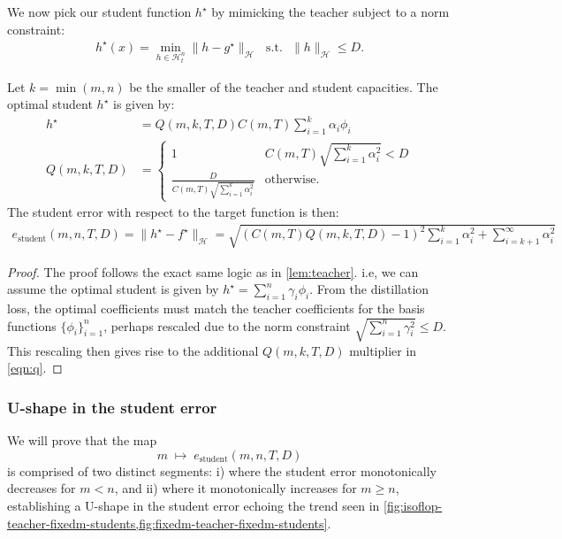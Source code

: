 We now pick our student function $h^\star$ by mimicking the teacher subject to a norm constraint:
\begin{align}
	h^\star(x) = \min_{h \in \mathcal{H}_t^n}\|h - g^\star\|_\mathcal{H} ~~~\text{s.t.}~~~ \|h\|_\mathcal{H} \leq D.
\end{align}
\begin{lemma}\label{lem:student}
	Let $k = \min(m,n)$ be the smaller of the teacher and student capacities. The optimal student $h^\star$ is given by:
	\begin{align}
		h^\star    & = Q(m,k,T,D)C(m,T)\sum_{i=1}^k\alpha_i\phi_i            \\
		Q(m,k,T,D) & = \begin{cases}
			               1                                             & C(m,T)\sqrt{\sum_{i=1}^k\alpha_i^2}<D \\
			               \frac{D}{C(m,T)\sqrt{\sum_{i=1}^k\alpha_i^2}} & \text{otherwise.}
		               \end{cases} \label{eqn:q}
	\end{align}
	The student error with respect to the target function is then:
	\begin{align}
		e_\text{student}(m,n,T,D) = \|h^\star - f^\star\|_\mathcal{H} = \sqrt{(C(m,T)Q(m,k,T,D) - 1)^2\sum_{i=1}^k\alpha_i^2+ \sum_{i=k+1}^\infty \alpha_i^2}
	\end{align}
	\begin{proof}
		The proof follows the exact same logic as in \cref{lem:teacher}. i.e, we can assume the optimal student is given by $h^\star = \sum_{i=1}^n \gamma_i \phi_i$. From the distillation loss, the optimal coefficients must match the teacher coefficients for the basis functions $\{\phi_i\}_{i=1}^n$, perhaps rescaled due to the norm constraint $\sqrt{\sum_{i=1}^n \gamma_i^2}\leq D$. This rescaling then gives rise to the additional $Q(m,k,T,D)$ multiplier in \cref{eqn:q}.
	\end{proof}
\end{lemma}

\subsubsection{U-shape in the student error}
\label{sssec:u-shape-in-the-student-error}

We will prove that the map
\[
	m \;\longmapsto\; e_{\text{student}}(m,n,T,D)
\]
is comprised of two distinct segments: i) where the student error monotonically decreases for $m < n$, and ii) where it monotonically increases for $m \geq n$, establishing a U-shape in the student error echoing the trend seen in \cref{fig:isoflop-teacher-fixedm-students,fig:fixedm-teacher-fixedm-students}.


